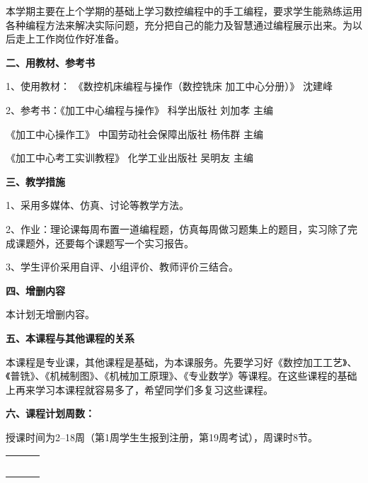 \documentclass[12pt]{article}
\begin{document}
本学期主要在上个学期的基础上学习数控编程中的手工编程，要求学生能熟练运用各种编程方法来解决实际问题，充分把自己的能力及智慧通过编程展示出来。为以后走上工作岗位作好准备。

\textbf{二、用教材、参考书}

1、使用教材： 《数控机床编程与操作（数控铣床 加工中心分册）》 沈建峰

2、参考书：《加工中心编程与操作》  科学出版社  刘加孝   主编

\hspace{4.5em}《加工中心操作工》 中国劳动社会保障出版社  杨伟群  主编

\hspace{4.5em}《加工中心考工实训教程》  化学工业出版社   吴明友 主编

\textbf{三、教学措施}

1、采用多媒体、仿真、讨论等教学方法。

2、作业：理论课每周布置一道编程题，仿真每周做习题集上的题目，实习除了完成课题外，还要每个课题写一个实习报告。

3、学生评价采用自评、小组评价、教师评价三结合。

\textbf{四、增删内容}

本计划无增删内容。

\textbf{五、本课程与其他课程的关系}

本课程是专业课，其他课程是基础，为本课服务。先要学习好《数控加工工艺》、《普铣》、《机械制图》、《机械加工原理》、《专业数学》等课程。在这些课程的基础上再来学习本课程就容易多了，希望同学们多复习这些课程。

\textbf{六、课程计划周数：}

授课时间为2--18周（第1周学生生报到注册，第19周考试），周课时8节。

\newpage 
\onecolumn \setlength{\parindent}{0em}

\begin{center}
	\begin{tabular}{M{12em}M{4cm}N}
		\parbox{12em}{\linespread{0.2} 
			\xiaosi \bf \song	{}\\[0.1cm]
		}
		&  \yihao \hei {}&\\
	\end{tabular}
\end{center}
 
\end{document}
